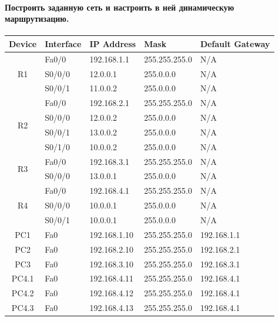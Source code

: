 \paragraph{Построить заданную сеть и настроить в ней динамическую маршрутизацию.}
\begin{center}
    \begin{tabular}{|c|l|l|l|l|}
        \hline
        Device              & Interface & IP Address   & Mask          & Default Gateway \\
        \hline
        \multirow{3}{*}{R1} & Fa0/0     & 192.168.1.1  & 255.255.255.0 & N/A             \\
        \cline{2-5}
        ~                   & S0/0/0    & 12.0.0.1     & 255.0.0.0     & N/A             \\
        \cline{2-5}
        ~                   & S0/0/1    & 11.0.0.2     & 255.0.0.0     & N/A             \\
        \hline
        \multirow{4}{*}{R2} & Fa0/0     & 192.168.2.1  & 255.255.255.0 & N/A             \\
        \cline{2-5}
        ~                   & S0/0/0    & 12.0.0.2     & 255.0.0.0     & N/A             \\
        \cline{2-5}
        ~                   & S0/0/1    & 13.0.0.2     & 255.0.0.0     & N/A             \\
        \cline{2-5}
        ~                   & S0/1/0    & 10.0.0.2     & 255.0.0.0     & N/A             \\
        \hline
        \multirow{2}{*}{R3} & Fa0/0     & 192.168.3.1  & 255.255.255.0 & N/A             \\
        \cline{2-5}
        ~                   & S0/0/0    & 13.0.0.1     & 255.0.0.0     & N/A             \\
        \hline
        \multirow{3}{*}{R4} & Fa0/0     & 192.168.4.1  & 255.255.255.0 & N/A             \\
        \cline{2-5}
        ~                   & S0/0/0    & 10.0.0.1     & 255.0.0.0     & N/A             \\
        \cline{2-5}
        ~                   & S0/0/1    & 10.0.0.1     & 255.0.0.0     & N/A             \\
        \hline
        PC1                 & Fa0       & 192.168.1.10 & 255.255.255.0 & 192.168.1.1     \\
        \hline
        PC2                 & Fa0       & 192.168.2.10 & 255.255.255.0 & 192.168.2.1     \\
        \hline
        PC3                 & Fa0       & 192.168.3.10 & 255.255.255.0 & 192.168.3.1     \\
        \hline
        PC4.1               & Fa0       & 192.168.4.11 & 255.255.255.0 & 192.168.4.1     \\
        \hline
        PC4.2               & Fa0       & 192.168.4.12 & 255.255.255.0 & 192.168.4.1     \\
        \hline
        PC4.3               & Fa0       & 192.168.4.13 & 255.255.255.0 & 192.168.4.1     \\
        \hline
    \end{tabular}
\end{center}

